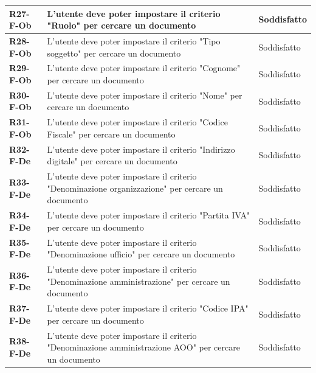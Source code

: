 \documentclass[a4paper,12pt]{article}
\begin{document}
{{\begin{longtable}{|>{\centering\arraybackslash}m{}|>{\centering\arraybackslash}m{}|>{\centering\arraybackslash}m{}|}
                \hline
                \textbf{R27-F-Ob} & L'utente deve poter impostare il criterio "Ruolo" per cercare un documento & 
                Soddisfatto \\ 
                \hline
                \textbf{R28-F-Ob} & L'utente deve poter impostare il criterio "Tipo soggetto" per cercare un documento & 
                Soddisfatto \\ 
                \hline
                \textbf{R29-F-Ob} & L'utente deve poter impostare il criterio "Cognome" per cercare un documento & 
                Soddisfatto \\ 
                \hline
                \textbf{R30-F-Ob} & L'utente deve poter impostare il criterio "Nome" per cercare un documento & 
                Soddisfatto \\ 
                \hline
                \textbf{R31-F-Ob} & L'utente deve poter impostare il criterio "Codice Fiscale" per cercare un documento & 
                Soddisfatto \\ 
                \hline
                \textbf{R32-F-De} & L'utente deve poter impostare il criterio "Indirizzo digitale" per cercare un documento & 
                Soddisfatto \\ 
                \hline
                \textbf{R33-F-De} & L'utente deve poter impostare il criterio "Denominazione organizzazione" per cercare un documento & 
                Soddisfatto \\ 
                \hline
                \textbf{R34-F-De} & L'utente deve poter impostare il criterio "Partita IVA" per cercare un documento & 
                Soddisfatto \\ 
                \hline
                \textbf{R35-F-De} & L'utente deve poter impostare il criterio "Denominazione ufficio" per cercare un documento & 
                Soddisfatto \\ 
                \hline
                \textbf{R36-F-De} & L'utente deve poter impostare il criterio "Denominazione amministrazione" per cercare un documento & 
                Soddisfatto \\
                \hline
                \textbf{R37-F-De} & L'utente deve poter impostare il criterio "Codice IPA" per cercare un documento & 
                Soddisfatto \\
                \hline
                \textbf{R38-F-De} & L'utente deve poter impostare il criterio "Denominazione amministrazione AOO" per cercare un documento & 
                Soddisfatto \\

\end{longtable}}}
\end{document}
